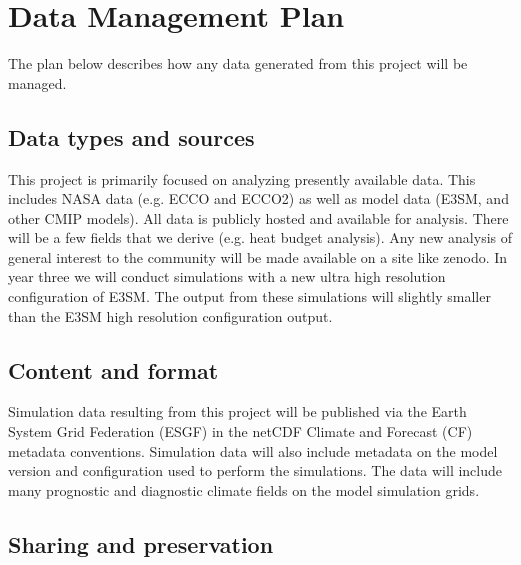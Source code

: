 
\section{Data Management Plan}
\label{sec:dataplan}

The plan below describes how any data generated from this project will be managed. 

\subsection{Data types and sources}

This project is primarily focused on analyzing presently available data.  This includes NASA data (e.g. ECCO and ECCO2) as well as model data (E3SM, and other CMIP models).  All data is publicly hosted and available for analysis.  There will be a few fields that we derive (e.g. heat budget analysis).  Any new analysis of general interest to the community will be made available on a site like zenodo.  In year three we will conduct simulations with a new ultra high resolution configuration of E3SM.  The output from these simulations will slightly smaller than the E3SM high resolution configuration output.

\subsection{Content and format}

Simulation data resulting from this project will be published via the Earth System Grid Federation (ESGF) in the netCDF Climate and Forecast (CF) metadata conventions. Simulation data will also include metadata on the model version and configuration used to perform the simulations. The data will include many prognostic and diagnostic climate fields on the model simulation grids.

\subsection{Sharing and preservation}
\label{sec:SharePreserv}

